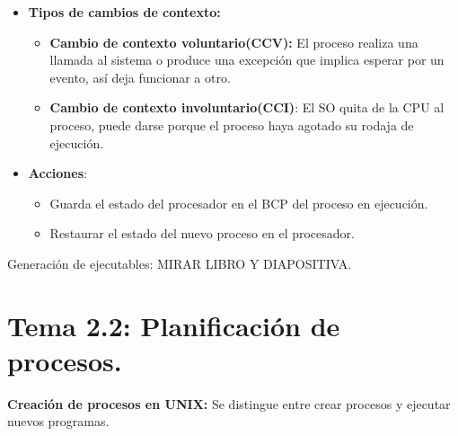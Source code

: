 \documentclass[12pt, twoside, openright]{report} %
\begin{document}
  \begin{itemize}
  \item \textbf{Tipos de cambios de contexto:}
    

    \begin{itemize}
    \item \textbf{Cambio de contexto voluntario(CCV):} El proceso realiza
      una llamada al sistema o produce una excepción que implica esperar
      por un evento, así deja funcionar a otro.
      
    \item \textbf{Cambio de contexto involuntario(CCI)}: El SO quita de la
      CPU al proceso, puede darse porque el proceso haya agotado su
      rodaja de ejecución.
      
    \end{itemize}
  \item \textbf{Acciones}:
    

    \begin{itemize}
    \item Guarda el estado del procesador en el BCP del proceso en
      ejecución.
      
    \item Restaurar el estado del nuevo proceso en el procesador.
      
    \end{itemize}
  \end{itemize}
Generación de ejecutables: MIRAR LIBRO Y DIAPOSITIVA.

\section{Tema 2.2: Planificación de procesos.}

\textbf{Creación de procesos en UNIX:} Se distingue entre crear
  procesos y ejecutar nuevos programas.
  
\end{document}

